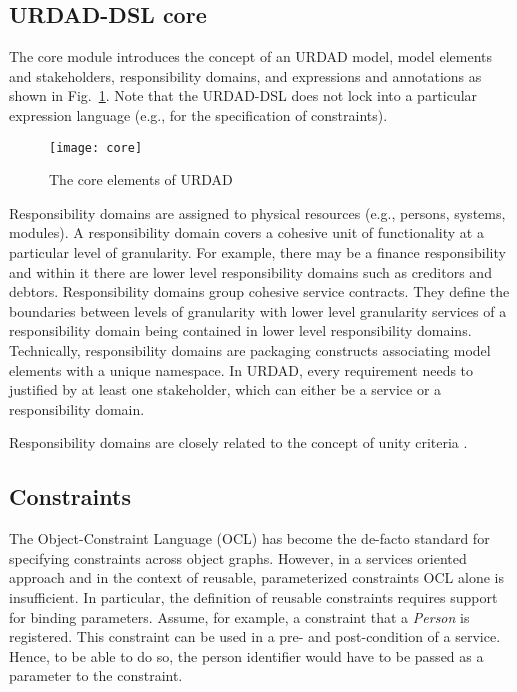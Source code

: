 
\subsection{URDAD-DSL core}

The core module introduces the concept of an URDAD model, model elements and stakeholders, responsibility domains, and expressions and annotations as shown in Fig.\ \ref{fig:metamodel}. Note that the URDAD-DSL does not lock into a particular expression language (e.g., for the specification of constraints). 

\begin{figure}[Htb]
  \centering
  \texttt{[image: core]}
  \caption{The core elements of URDAD}
  \label{fig:metamodel}
\end{figure}

Responsibility domains are assigned to physical resources (e.g., persons, systems, modules). A responsibility domain covers a cohesive unit of functionality at a particular level of granularity. For example, there may be a finance responsibility and within it there are lower level responsibility domains such as creditors and debtors. Responsibility domains group cohesive service contracts. They define the boundaries between levels of granularity with lower level granularity services of a responsibility domain being contained in lower level responsibility domains. Technically, responsibility domains are packaging constructs associating model elements with a unique namespace. In URDAD, every requirement needs to justified by at least one stakeholder, which can either be a service or a responsibility domain.

Responsibility domains are closely related to the concept of unity criteria \cite{gonzalez_unity_2009}.


\subsection{Constraints}

The Object-Constraint Language (OCL) has become the de-facto standard for specifying constraints across object graphs. However, in a services oriented approach and in the context of reusable, parameterized constraints OCL alone is insufficient. In particular, the definition of reusable constraints requires support for binding parameters. Assume, for example, a constraint that a \emph{Person} is registered. This constraint can be used in a pre- and post-condition of a service. Hence, to be able to do so, the person identifier would have to be passed as a parameter to the constraint.

